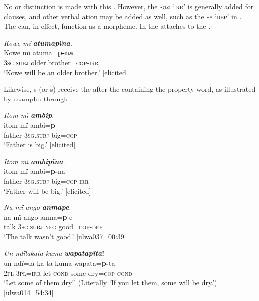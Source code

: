 No  or  distinction is made with this . However, the   \textit{-na} ‘\textsc{irr}’ is generally added for  clauses, and other verbal ation may be added as well, such as the  \textit{-e} ‘\textsc{dep}’ in . The  can, in effect, function as a  morpheme. In  the   attaches to the .

\ea%
    \label{ex:pred:37}
          \textit{Kowe mï} \textbf{\textit{atumapïna}}.\\
\gll Kowe  mï      atuma=\textbf{p-na}\\
    [name]  \textsc{3sg.subj}  older.brother=\textsc{cop}{}-\textsc{irr}\\
\glt `Kowe will be an older brother.’ [elicited]
\z

Likewise, s (or s) receive the  after the  containing the property word, as illustrated by examples  through .

\ea%
    \label{ex:pred:38}
          \textit{Itom mï} \textbf{\textit{ambip}}.\\
\gll itom  mï      ambi=\textbf{p}\\
    father  3\textsc{sg.subj}  big=\textsc{cop}\\
\glt `Father is big.’ [elicited]
\z

\ea%
    \label{ex:pred:39}
          \textit{Itom mï} \textbf{\textit{ambipïna}}.\\
\gll itom  mï      ambi=\textbf{p-}na\\
    father  3\textsc{sg.subj}  big=\textsc{cop}{}-\textsc{irr}\\
\glt `Father will be big.’ [elicited]
\z

\ea%
    \label{ex:pred:40}
          \textit{Na mï ango} \textbf{\textit{anmape}}.\\
\gll na    mï      ango  anma=\textbf{p}{}-e\\
    talk  \textsc{3sg.subj}  \textsc{neg}  good\textsc{=cop{}-dep}\\
\glt `The talk wasn’t good.’ [ulwa037\_00:39]
\z

\ea%
    \label{ex:pred:41}
          \textit{Un ndïlakata kuma} \textbf{\textit{wapatapïta}!}\\
\gll    un  ndï=la-ka-ta    kuma  wapata=\textbf{p-}ta\\
    2\textsc{pl}  \textsc{3pl=irr-}let-\textsc{cond}  some  dry=\textsc{cop-cond}\\
\glt `Let some of them dry!’ (Literally ‘If you let them, some will be dry.’) [ulwa014\_54:34]
\z

